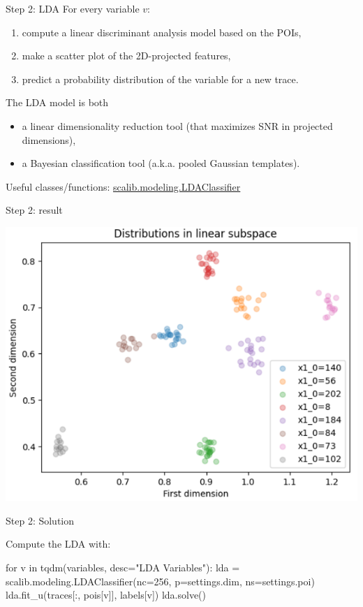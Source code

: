 \documentclass[aspectratio=169]{beamer}
\begin{document}
\begin{frame}{Step 2: LDA}
    For every variable $v$:
    \begin{enumerate}
        \item compute a linear discriminant analysis model based on the POIs,
        \item make a scatter plot of the 2D-projected features,
        \item predict a probability distribution of the variable for a new trace.
    \end{enumerate}

    The LDA model is both
    \begin{itemize}
        \item a linear dimensionality reduction tool (that maximizes SNR in projected dimensions),
        \item a Bayesian classification tool (a.k.a. pooled Gaussian templates).
    \end{itemize}

    Useful classes/functions:
    \href{https://scalib.readthedocs.io/en/stable/source/api/scalib.modeling.LDAClassifier.html}{scalib.modeling.LDAClassifier}
\end{frame}

\begin{frame}{Step 2: result}
    \begin{center}
        \includegraphics[width=.6\textwidth]{figures/res_step2.png}
    \end{center}
\end{frame}


\begin{frame}[containsverbatim]{Step 2: Solution}

Compute the LDA with:
\begin{python}
for v in tqdm(variables, desc="LDA Variables"):
    lda = scalib.modeling.LDAClassifier(nc=256, p=settings.dim, ns=settings.poi)
    lda.fit_u(traces[:, pois[v]], labels[v])
    lda.solve()
\end{python}

\end{frame}
\end{document}

